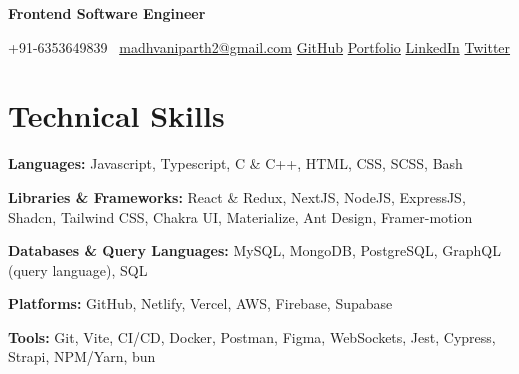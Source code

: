 \documentclass[11pt,a4paper,sans]{moderncv}
\begin{document}
\makecvtitle
\vspace*{-16mm}
\begin{center}\textbf{ Frontend Software Engineer }\end{center}

\begin{center}
{+91-6353649839}~ \quad \href{mailto:madhvaniparth2@gmail.com}{madhvaniparth2@gmail.com} \quad
\href{https://github.com/ParthMadhvani2}{\color{blue}GitHub} \quad
\href{https://parthmadhvani2.vercel.app/}{\color{blue}Portfolio}  \quad
\href{https://www.linkedin.com/in/parthmadhvani2/}{\color{blue}LinkedIn} \quad
\href{https://twitter.com/parthmadhvani2}{\color{blue}Twitter}
\end{center}



\section{Technical Skills}
\begin{itemize}[leftmargin=0in, label={}]
\normalsize{
    \item \textbf{Languages:} Javascript, Typescript, C \& C++, HTML, CSS, SCSS, Bash
    \item \textbf{Libraries \& Frameworks:} React \& Redux, NextJS, NodeJS, ExpressJS, Shadcn, Tailwind CSS, Chakra UI, Materialize, Ant Design, Framer-motion
    \item \textbf{Databases \& Query Languages:} MySQL, MongoDB, PostgreSQL, GraphQL (query language), SQL
    \item \textbf{Platforms:} GitHub, Netlify, Vercel, AWS, Firebase, Supabase
    \item \textbf{Tools:} Git, Vite, CI/CD, Docker, Postman, Figma, WebSockets, Jest, Cypress, Strapi, NPM/Yarn, bun
}
\end{itemize}

\end{document}
